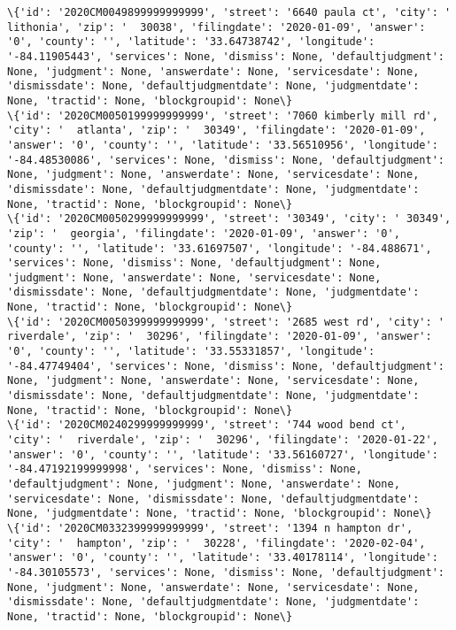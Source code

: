 \documentclass[11pt]{article}
\begin{document}
\begin{Verbatim}[commandchars=\\\{\}]
\{'id': '2020CM0049899999999999', 'street': '6640 paula ct', 'city': '  lithonia', 'zip': '  30038', 'filingdate': '2020-01-09', 'answer': '0', 'county': '', 'latitude': '33.64738742', 'longitude': '-84.11905443', 'services': None, 'dismiss': None, 'defaultjudgment': None, 'judgment': None, 'answerdate': None, 'servicesdate': None, 'dismissdate': None, 'defaultjudgmentdate': None, 'judgmentdate': None, 'tractid': None, 'blockgroupid': None\}
\{'id': '2020CM0050199999999999', 'street': '7060 kimberly mill rd', 'city': '  atlanta', 'zip': '  30349', 'filingdate': '2020-01-09', 'answer': '0', 'county': '', 'latitude': '33.56510956', 'longitude': '-84.48530086', 'services': None, 'dismiss': None, 'defaultjudgment': None, 'judgment': None, 'answerdate': None, 'servicesdate': None, 'dismissdate': None, 'defaultjudgmentdate': None, 'judgmentdate': None, 'tractid': None, 'blockgroupid': None\}
\{'id': '2020CM0050299999999999', 'street': '30349', 'city': ' 30349', 'zip': '  georgia', 'filingdate': '2020-01-09', 'answer': '0', 'county': '', 'latitude': '33.61697507', 'longitude': '-84.488671', 'services': None, 'dismiss': None, 'defaultjudgment': None, 'judgment': None, 'answerdate': None, 'servicesdate': None, 'dismissdate': None, 'defaultjudgmentdate': None, 'judgmentdate': None, 'tractid': None, 'blockgroupid': None\}
\{'id': '2020CM0050399999999999', 'street': '2685 west rd', 'city': '  riverdale', 'zip': '  30296', 'filingdate': '2020-01-09', 'answer': '0', 'county': '', 'latitude': '33.55331857', 'longitude': '-84.47749404', 'services': None, 'dismiss': None, 'defaultjudgment': None, 'judgment': None, 'answerdate': None, 'servicesdate': None, 'dismissdate': None, 'defaultjudgmentdate': None, 'judgmentdate': None, 'tractid': None, 'blockgroupid': None\}
\{'id': '2020CM0240299999999999', 'street': '744 wood bend ct', 'city': '  riverdale', 'zip': '  30296', 'filingdate': '2020-01-22', 'answer': '0', 'county': '', 'latitude': '33.56160727', 'longitude': '-84.47192199999998', 'services': None, 'dismiss': None, 'defaultjudgment': None, 'judgment': None, 'answerdate': None, 'servicesdate': None, 'dismissdate': None, 'defaultjudgmentdate': None, 'judgmentdate': None, 'tractid': None, 'blockgroupid': None\}
\{'id': '2020CM0332399999999999', 'street': '1394 n hampton dr', 'city': '  hampton', 'zip': '  30228', 'filingdate': '2020-02-04', 'answer': '0', 'county': '', 'latitude': '33.40178114', 'longitude': '-84.30105573', 'services': None, 'dismiss': None, 'defaultjudgment': None, 'judgment': None, 'answerdate': None, 'servicesdate': None, 'dismissdate': None, 'defaultjudgmentdate': None, 'judgmentdate': None, 'tractid': None, 'blockgroupid': None\}

\end{Verbatim}
\end{document}
